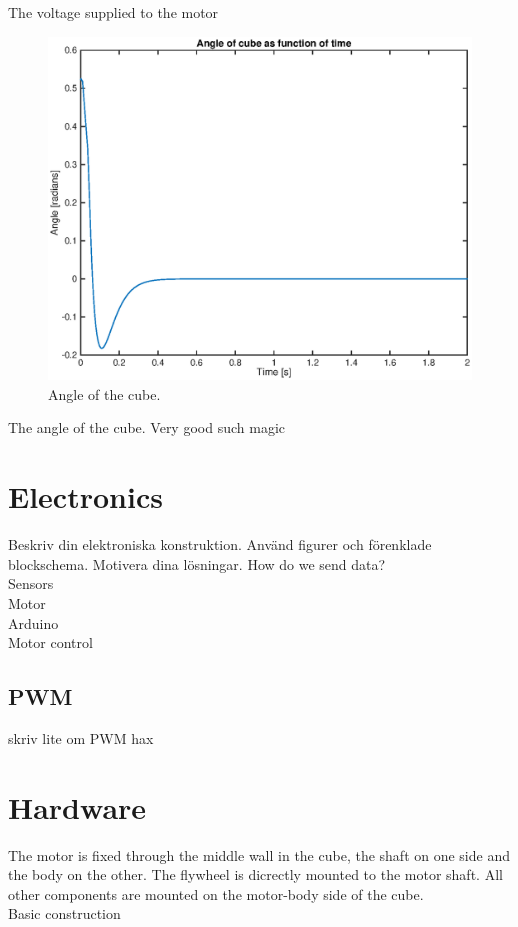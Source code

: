 \documentclass[a4paper,11pt]{kth-mag}
\begin{document}
The voltage supplied to the motor

\begin{figure}[!htb]
\centering
\includegraphics[scale=.7]{angleplot.eps}
\caption{Angle of the cube.}
\label{fig:voltageplot}
\end{figure}

The angle of the cube. Very good such magic


\section{Electronics}
Beskriv din elektroniska konstruktion. Använd figurer och förenklade blockschema. Motivera dina lösningar.
How do we send data?
\\ Sensors
\\ Motor
\\ Arduino
\\ Motor control

\subsection{PWM}
skriv lite om PWM hax

\section{Hardware}
The motor is fixed through the middle wall in the cube, the shaft on one side and the body on the other. The flywheel is dicrectly mounted to the motor shaft. All other components are mounted on the motor-body side of the cube.
\\ Basic construction
\end{document}
